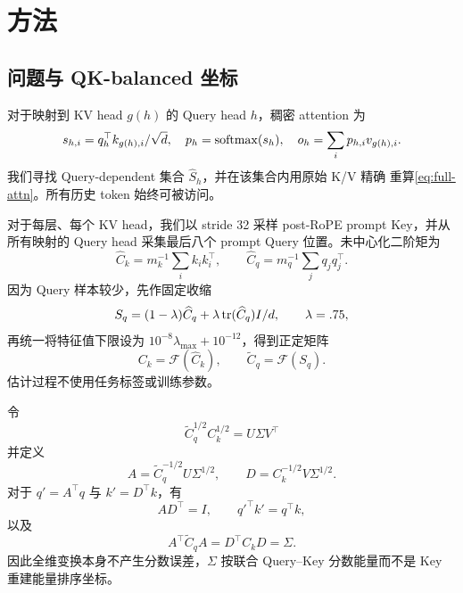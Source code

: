 \section{\method 方法}
\label{sec:method}

\subsection{问题与 QK-balanced 坐标}

对于映射到 KV head $g(h)$ 的 Query head $h$，稠密 attention 为
\begin{equation}
 s_{h,i}=q_h^\top k_{g(h),i}/\sqrt d,\quad
 p_h=\operatorname{softmax}(s_h),\quad o_h=\sum_i p_{h,i}v_{g(h),i}.
 \label{eq:full-attn}
\end{equation}
我们寻找 Query-dependent 集合 $\widehat S_h$，并在该集合内用原始 K/V 精确
重算\cref{eq:full-attn}。所有历史 token 始终可被访问。

对于每层、每个 KV head，我们以 stride 32 采样 post-RoPE prompt Key，并从
所有映射的 Query head 采集最后八个 prompt Query 位置。未中心化二阶矩为
\begin{equation}
 \widehat C_k=m_k^{-1}\sum_i k_i k_i^\top,\qquad
 \widehat C_q=m_q^{-1}\sum_j q_j q_j^\top .
 \label{eq:qk-moments}
\end{equation}
因为 Query 样本较少，先作固定收缩
\begin{equation}
 S_q=(1-\lambda)\widehat C_q+\lambda\operatorname{tr}(\widehat C_q)I/d,
 \qquad\lambda=.75,
 \label{eq:q-shrink}
\end{equation}
再统一将特征值下限设为 $10^{-8}\lambda_{\max}+10^{-12}$，得到正定矩阵
\begin{equation}
 C_k=\mathcal F(\widehat C_k),\qquad
 \widetilde C_q=\mathcal F(S_q).
 \label{eq:moment-floor}
\end{equation}
估计过程不使用任务标签或训练参数。

令
\begin{equation}
 \widetilde C_q^{1/2}C_k^{1/2}=U\Sigma V^\top
 \label{eq:qk-svd}
\end{equation}
并定义
\begin{equation}
 A=\widetilde C_q^{-1/2}U\Sigma^{1/2},\qquad
 D=C_k^{-1/2}V\Sigma^{1/2}.
 \label{eq:qk-factors}
\end{equation}
对于 $q'=A^\top q$ 与 $k'=D^\top k$，有
\begin{equation}
 AD^\top=I,\qquad {q'}^\top k'=q^\top k,
 \label{eq:qk-exact}
\end{equation}
以及
\begin{equation}
 A^\top\widetilde C_qA=D^\top C_kD=\Sigma.
 \label{eq:qk-covariance}
\end{equation}
因此全维变换本身不产生分数误差，$\Sigma$ 按联合 Query--Key 分数能量而不是
Key 重建能量排序坐标。


